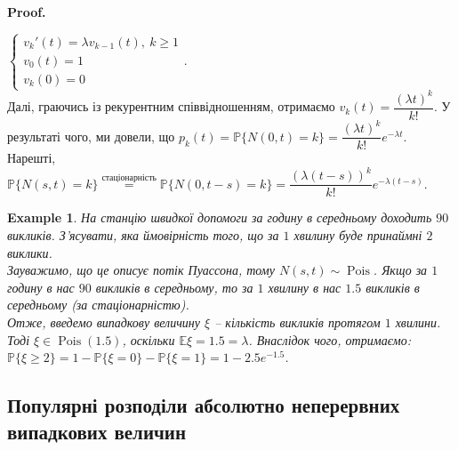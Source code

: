 \documentclass[a4paper, 10pt]{article}
\makeatletter
\theoremstyle{theoremdd}
\newtheorem{example}[theorem]{Example}
\renewenvironment{proof}[1][Proof.\\]{\par
\pushQED{\hfill \qed}%
\normalfont \topsep6\p@\@plus6\p@\relax
\trivlist
\item\relax
{\bfseries
#1\@addpunct{.}}\hspace\labelsep\ignorespaces
}{%
\popQED\endtrivlist\@endpefalse
}
\DeclareMathOperator{\Pois}{Pois}
\makeatother
\begin{document}
\begin{proof}
$\begin{cases}
v_k'(t) = \lambda v_{k-1}(t),\ k \geq 1 \\
v_0(t) = 1 \\
v_k(0) = 0
\end{cases}$.\\
Далі, граючись із рекурентним співвідношенням, отримаємо $v_k(t) = \dfrac{(\lambda t)^k}{k!}$. У результаті чого, ми довели, що $p_k(t) = \mathbb{P}\{N(0,t) = k\} = \dfrac{(\lambda t)^k}{k!} e^{-\lambda t}$. Нарешті,\\
$\mathbb{P}\{N(s,t) = k\} \overset{\text{стаціонарність}}{=} \mathbb{P}\{N(0,t-s) = k\} = \dfrac{(\lambda (t-s))^k}{k!} e^{-\lambda (t-s)}$.
\end{proof}

\begin{example}
На станцію швидкої допомоги за годину в середньому доходить $90$ викликів. З'ясувати, яка ймовірність того, що за $1$ хвилину буде принаймні $2$ виклики.\\
Зауважимо, що це описує потік Пуассона, тому $N(s,t) \sim \Pois$. Якщо за $1$ годину в нас $90$ викликів в середньому, то за $1$ хвилину в нас $1.5$ викликів в середньому (за стаціонарністю).\\
Отже, введемо випадкову величину $\xi$ -- кількість викликів протягом $1$ хвилини. Тоді $\xi \in \Pois(1.5)$, оскільки $\mathbb{E}\xi = 1.5 = \lambda$. Внаслідок чого, отримаємо:\\
$\mathbb{P}\{\xi \geq 2\} = 1 - \mathbb{P}\{\xi = 0\} - \mathbb{P}\{\xi = 1\} = 1 - 2.5 e^{-1.5}$.
\end{example}

\subsection{Популярні розподіли абсолютно неперервних випадкових величин}
\end{document}
